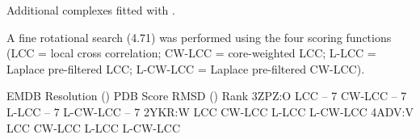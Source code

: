 \caption{Additional complexes fitted with \powerfit.}
{A fine rotational search (4.71\Deg) was performed using the four scoring
functions (LCC = local cross correlation; CW-LCC = core-weighted LCC; L-LCC =
Laplace pre-filtered LCC; L-CW-LCC = Laplace pre-filtered CW-LCC).}
\stopbuffer

\bTABLE
\setupTABLE[c][1][width=4em]
\setupTABLE[c][2][width=6em]
\setupTABLE[c][3][width=4em]
\setupTABLE[r][2,3,4,5,10,11,12,13][background=color, 
    backgroundcolor=tableoddrow]
\setupTABLE[r][6,7,8,9][background=color, backgroundcolor=white]
\bTABLEhead
\bTR \bTD EMDB \eTD \bTD Resolution (\Angstrom) \eTD \bTD PDB \eTD \bTD Score \eTD \bTD RMSD (\Angstrom) \eTD \bTD Rank \eTD \eTR
\eTABLEhead
\bTABLEbody
\bTR {} \eTD {} \eTD \bTD[nr=4] 3ZPZ:O \eTD \bTD LCC \eTD {} \eTD {} -- 7 \eTD \eTR
\bTR \bTD CW-LCC \eTD {} \eTD {} -- 7 \eTD \eTR
\bTR \bTD L-LCC \eTD {} \eTD {} -- 7 \eTD \eTR
\bTR \bTD L-CW-LCC \eTD {} \eTD {} -- 7 \eTD \eTR
%
\bTR {} \eTD {} \eTD \bTD[nr=4] 2YKR:W \eTD \bTD LCC \eTD {} \eTD {} \eTD \eTR
\bTR \bTD CW-LCC \eTD {} \eTD {} \eTD \eTR
\bTR \bTD L-LCC \eTD {} \eTD {} \eTD \eTR
\bTR \bTD L-CW-LCC \eTD {} \eTD {} \eTD \eTR
%
\bTR {} \eTD {} \eTD \bTD[nr=4] 4ADV:V \eTD \bTD LCC \eTD {} \eTD {} \eTD \eTR
\bTR \bTD CW-LCC \eTD {} \eTD {} \eTD \eTR
\bTR \bTD L-LCC \eTD {} \eTD {} \eTD \eTR
\bTR \bTD L-CW-LCC \eTD {} \eTD {} \eTD \eTR
\eTABLEbody
\eTABLE
\stopbuffer
